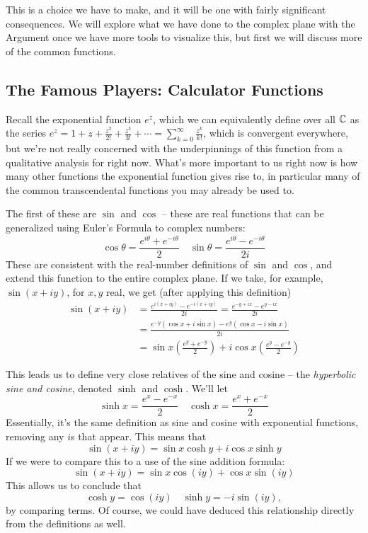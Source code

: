 This is a choice we have to make, and it will be one with fairly significant consequences. We will explore what we have done to the complex plane with the Argument once we have more tools to visualize this, but first we will discuss more of the common functions.


\subsection{The Famous Players: Calculator Functions}

Recall the exponential function $e^z$, which we can equivalently define over all $\mathbb C$ as the series $e^z = 1 + z + \frac{z^2}{2!}  + \frac{z^3}{3!} + \cdots = \sum_{k=0}^\infty \frac{z^k}{k!}$, which is convergent everywhere, but we're not really concerned with the underpinnings of this function from a qualitative analysis for right now. What's more important to us right now is how many other functions the exponential function gives rise to, in particular many of the common transcendental functions you may already be used to.

The first of these are $\sin$ and $\cos$ -- these are real functions that can be generalized using Euler's Formula to complex numbers:
\[
    \cos \theta = \frac{e^{i\theta} + e^{-i\theta}}{2} \quad \sin \theta = \frac{e^{i\theta} - e^{-i\theta}}{2i}
\]
These are consistent with the real-number definitions of $\sin$ and $\cos$, and extend this function to the entire complex plane. If we take, for example, $\sin(x+iy)$, for $x, y$ real, we get (after applying this definition)
\begin{align*}
    \sin (x+iy) & = \frac{e^{i(x+iy)}- e^{-i(x+iy)}}{2i} = \frac{e^{-y + ix}- e^{y - ix}}{2i}                     \\
                & = \frac{e^{-y}(\cos x + i \sin x) - e^{y}(\cos x - i \sin x)}{2i}                               \\
                & = \sin x \left(\frac{e^y + e^{-y}}{2} \right) + i \cos x \left(\frac{e^{y} - e^{-y}}{2} \right)
\end{align*}

This leads us to define very close relatives of the sine and cosine -- the \textit{hyperbolic sine and cosine}, denoted $\sinh$ and $\cosh$. We'll let
\[
    \sinh x = \frac{e^{x} - e^{-x}}{2} \quad \cosh x = \frac{e^x + e^{-x}}{2}
\]
Essentially, it's the same definition as sine and cosine with exponential functions, removing any $i$s that appear. This means that
\[
    \sin(x +iy) = \sin x \cosh y + i \cos x \sinh y
\]
If we were to compare this to a use of the sine addition formula:
\[
    \sin(x + iy) = \sin x \cos(iy) + \cos x \sin(iy)
\]
This allows us to conclude that
\[
    \cosh y = \cos (iy) \quad \sinh y = -i \sin(iy),
\]
by comparing terms. Of course, we could have deduced this relationship directly from the definitions as well.

